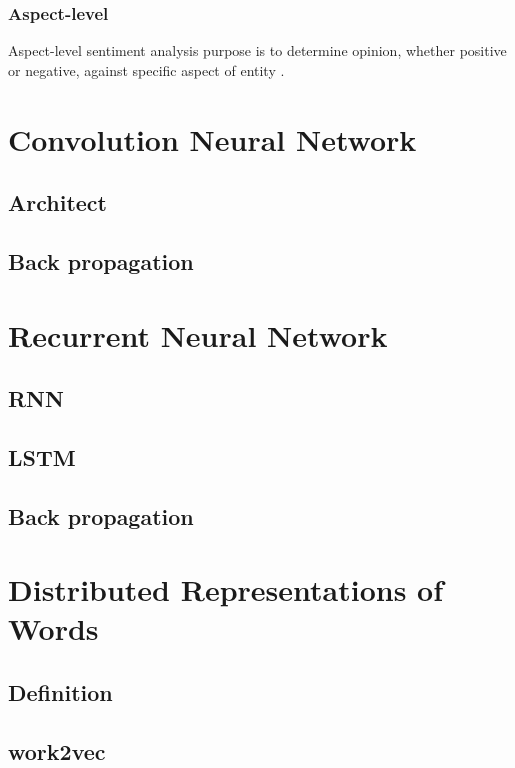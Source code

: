 \subsubsection{Aspect-level}
Aspect-level  sentiment analysis purpose is to determine opinion, whether positive or negative, against specific aspect of entity \cite{liu2012sentiment}.



\section{Convolution Neural Network}\label{sec:cnn}

\subsection{Architect}

\subsection{Back propagation}

\section{Recurrent Neural Network}

\subsection{RNN}

\subsection{LSTM}

\subsection{Back propagation}

\section{Distributed Representations of Words}
\subsection{Definition}

\subsection{work2vec}

